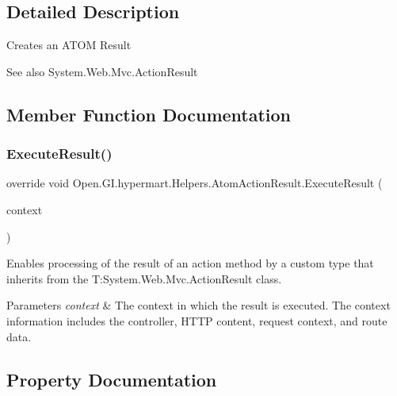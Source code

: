 \subsection{Detailed Description}
Creates an A\+T\+OM Result 

\begin{DoxySeeAlso}{See also}
System.\+Web.\+Mvc.\+Action\+Result


\end{DoxySeeAlso}


\subsection{Member Function Documentation}
\hypertarget{class_open_1_1_g_i_1_1hypermart_1_1_helpers_1_1_atom_action_result_a525b622f00e4c2294a4fedb438273981}{}\label{class_open_1_1_g_i_1_1hypermart_1_1_helpers_1_1_atom_action_result_a525b622f00e4c2294a4fedb438273981} 
\subsubsection{\texorpdfstring{Execute\+Result()}{ExecuteResult()}}
{\footnotesize\ttfamily override void Open.\+G\+I.\+hypermart.\+Helpers.\+Atom\+Action\+Result.\+Execute\+Result (\begin{DoxyParamCaption}\item[{Controller\+Context}]{context }\end{DoxyParamCaption})}



Enables processing of the result of an action method by a custom type that inherits from the T\+:\+System.\+Web.\+Mvc.\+Action\+Result class. 


\begin{DoxyParams}{Parameters}
{\em context} & The context in which the result is executed. The context information includes the controller, H\+T\+TP content, request context, and route data.\\
\hline
\end{DoxyParams}


\subsection{Property Documentation}
\hypertarget{class_open_1_1_g_i_1_1hypermart_1_1_helpers_1_1_atom_action_result_a17a5a951bdf5ed9f8a93f24843e124ca}{}\label{class_open_1_1_g_i_1_1hypermart_1_1_helpers_1_1_atom_action_result_a17a5a951bdf5ed9f8a93f24843e124ca} 
